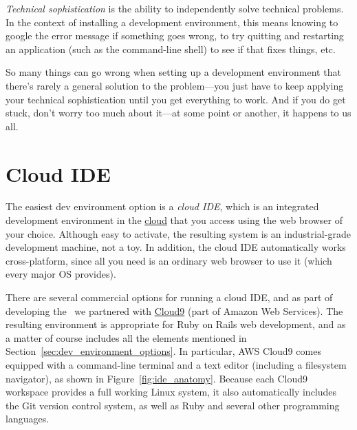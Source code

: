 \begin{aside}
\label{aside:technical_sophistication}

\emph{Technical sophistication} is the ability to independently solve technical problems. In the context of installing a development environment, this means knowing to google the error message if something goes wrong, to try quitting and restarting an application (such as the command-line shell) to see if that fixes things, etc.

So many things can go wrong when setting up a development environment that there's rarely a general solution to the problem---you just have to keep applying your technical sophistication until you get everything to work. And if you do get stuck, don't worry too much about it---at some point or another, it happens to us all.

\end{aside}



\section{Cloud IDE}
\label{sec:cloud_ide}

The easiest dev environment option is a \emph{cloud IDE}, which is an integrated development environment in the \href{https://en.wikipedia.org/wiki/Cloud_computing}{cloud} that you access using the web browser of your choice. Although easy to activate, the resulting system is an industrial-grade development machine, not a toy. In addition, the cloud IDE automatically works cross-platform, since all you need is an ordinary web browser to use it (which every major OS provides).

There are several commercial options for running a cloud IDE, and as part of developing the \rort\ we partnered with \href{http://c9.io/}{Cloud9} (part of Amazon Web Services). The resulting environment is appropriate for Ruby on Rails web development, and as a matter of course includes all the elements mentioned in Section~\ref{sec:dev_environment_options}. In particular, AWS Cloud9 comes equipped with a command-line terminal and a text editor (including a filesystem navigator), as shown in Figure~\ref{fig:ide_anatomy}. Because each Cloud9 workspace provides a full working Linux system, it also automatically includes the Git version control system, as well as Ruby and several other programming languages.

